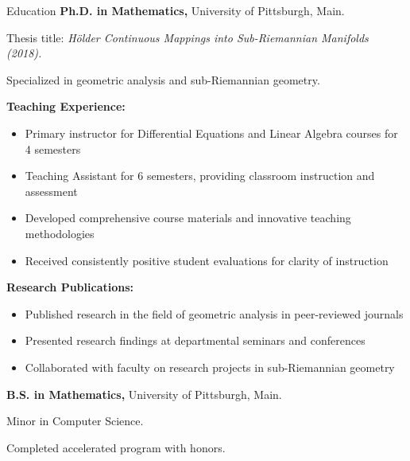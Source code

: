 \begin{rubric}{Education}
%
	\textbf{Ph.D. in Mathematics,} University of Pittsburgh, Main.
	\par Thesis title: \emph{Hölder Continuous Mappings into Sub-Riemannian Manifolds (2018).}
	\par Specialized in geometric analysis and sub-Riemannian geometry.
	\par \textbf{Teaching Experience:}
	\begin{itemize}
		\item Primary instructor for Differential Equations and Linear Algebra courses for 4 semesters
		\item Teaching Assistant for 6 semesters, providing classroom instruction and assessment
		\item Developed comprehensive course materials and innovative teaching methodologies
		\item Received consistently positive student evaluations for clarity of instruction
	\end{itemize}
	\par \textbf{Research Publications:}
	\begin{itemize}
		\item Published research in the field of geometric analysis in peer-reviewed journals
		\item Presented research findings at departmental seminars and conferences
		\item Collaborated with faculty on research projects in sub-Riemannian geometry
	\end{itemize}
%
%
	\textbf{B.S. in Mathematics,} University of Pittsburgh, Main.\par
	Minor in Computer Science.\par
	Completed accelerated program with honors.
\end{rubric}
